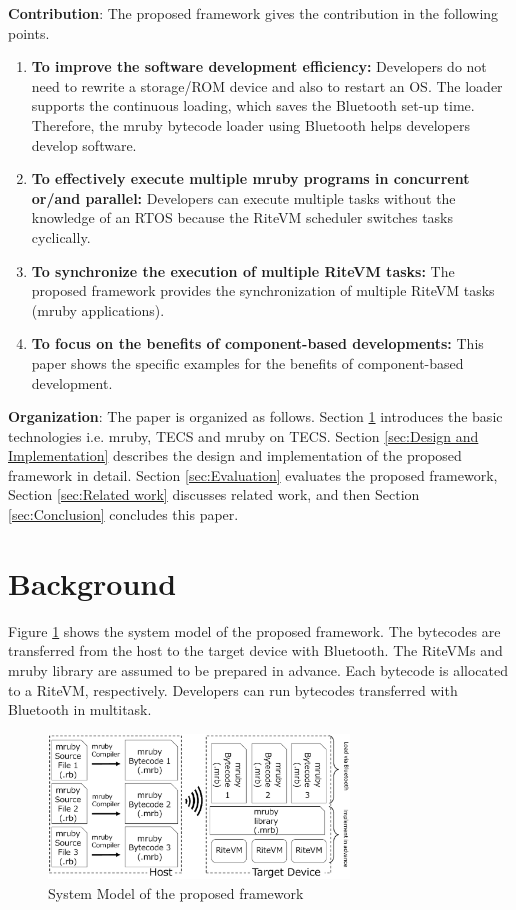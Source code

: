\documentclass{sig-alternate-05-2015}
\begin{document}
{\bf Contribution}: The proposed framework gives the contribution in the following points.
\begin{enumerate}
\item {\bf To improve the software development efficiency:} Developers do not need to rewrite a storage/ROM device and also to restart an OS.
The loader supports the continuous loading, which saves the Bluetooth set-up time.
Therefore, the mruby bytecode loader using Bluetooth helps developers develop software.
\item {\bf To effectively execute multiple mruby programs in concurrent or/and parallel:} Developers can execute multiple tasks without the knowledge of an RTOS because the RiteVM scheduler switches tasks cyclically.
\item {\bf To synchronize the execution of multiple RiteVM tasks:} The proposed framework provides the synchronization of multiple RiteVM tasks (mruby applications).
\item {\bf To focus on the benefits of component-based developments:} This paper shows the specific examples for the benefits of component-based development. 
\end{enumerate}

{\bf Organization}: The paper is organized as follows.
Section \ref{sec:Background} introduces the basic technologies i.e. mruby, TECS and mruby on TECS.
Section \ref{sec:Design and Implementation} describes the design and implementation of the proposed framework in detail.
Section \ref{sec:Evaluation} evaluates the proposed framework, Section \ref{sec:Related work} discusses related work, and then Section \ref{sec:Conclusion} concludes this paper.

\section{Background}
\label{sec:Background}
Figure \ref{fig:proposed} shows the system model of the proposed framework.
The bytecodes are transferred from the host to the target device with Bluetooth.
The RiteVMs and mruby library are assumed to be prepared in advance.
Each bytecode is allocated to a RiteVM, respectively.
Developers can run bytecodes transferred with Bluetooth in multitask.

\begin{figure}[t]
    \centering
    \includegraphics[width=8cm,clip]{figure/proposed.eps}
    \caption{System Model of the proposed framework}
    \label{fig:proposed}
\end{figure}
\end{document}
